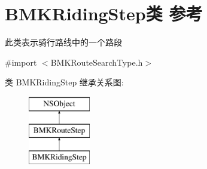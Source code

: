 \hypertarget{interface_b_m_k_riding_step}{}\section{B\+M\+K\+Riding\+Step类 参考}
\label{interface_b_m_k_riding_step}


此类表示骑行路线中的一个路段  




{\ttfamily \#import $<$B\+M\+K\+Route\+Search\+Type.\+h$>$}

类 B\+M\+K\+Riding\+Step 继承关系图\+:\begin{figure}[H]
\begin{center}
\leavevmode
\includegraphics[height=3.000000cm]{interface_b_m_k_riding_step}
\end{center}
\end{figure}
